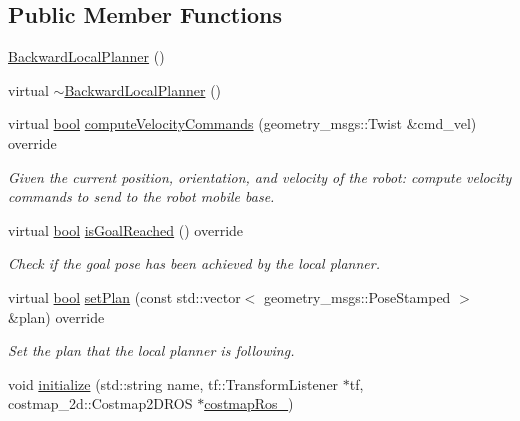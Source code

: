 \subsection*{Public Member Functions}
\begin{DoxyCompactItemize}
\item 
\hyperlink{classcl__move__base__z_1_1backward__local__planner_1_1BackwardLocalPlanner_a79e73a858b2a13c7fe10c52e08568fd6}{Backward\+Local\+Planner} ()
\item 
virtual \hyperlink{classcl__move__base__z_1_1backward__local__planner_1_1BackwardLocalPlanner_a6a36aa94617786c6958e861e64abb862}{$\sim$\+Backward\+Local\+Planner} ()
\item 
virtual \hyperlink{classbool}{bool} \hyperlink{classcl__move__base__z_1_1backward__local__planner_1_1BackwardLocalPlanner_a25437208766366ca22f967fe72e80988}{compute\+Velocity\+Commands} (geometry\+\_\+msgs\+::\+Twist \&cmd\+\_\+vel) override
\begin{DoxyCompactList}\small\item\em Given the current position, orientation, and velocity of the robot\+: compute velocity commands to send to the robot mobile base. \end{DoxyCompactList}\item 
virtual \hyperlink{classbool}{bool} \hyperlink{classcl__move__base__z_1_1backward__local__planner_1_1BackwardLocalPlanner_a06a99e609ed31b97f765351dd6827722}{is\+Goal\+Reached} () override
\begin{DoxyCompactList}\small\item\em Check if the goal pose has been achieved by the local planner. \end{DoxyCompactList}\item 
virtual \hyperlink{classbool}{bool} \hyperlink{classcl__move__base__z_1_1backward__local__planner_1_1BackwardLocalPlanner_ab11a0eec45f24b5a5a3987a50427eed4}{set\+Plan} (const std\+::vector$<$ geometry\+\_\+msgs\+::\+Pose\+Stamped $>$ \&plan) override
\begin{DoxyCompactList}\small\item\em Set the plan that the local planner is following. \end{DoxyCompactList}\item 
void \hyperlink{classcl__move__base__z_1_1backward__local__planner_1_1BackwardLocalPlanner_ae7659aa099ce5a329a9ef046dabcc599}{initialize} (std\+::string name, tf\+::\+Transform\+Listener $\ast$tf, costmap\+\_\+2d\+::\+Costmap2\+D\+R\+OS $\ast$\hyperlink{classcl__move__base__z_1_1backward__local__planner_1_1BackwardLocalPlanner_a4136268882a105d9e06e173d85d5c0dc}{costmap\+Ros\+\_\+})

\end{DoxyCompactItemize}
